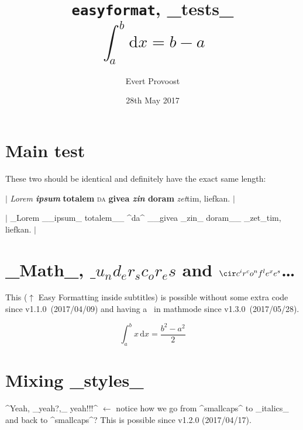 \documentclass[11pt]{article}
\title{\texttt{easyformat}, _tests_\\$$ \int_a^b \mathrm{d}x = b - a $$}
\author{Evert Provoost}
\date{28th May 2017}
\begin{document}
	\enableeasyformat %

	\maketitle
	\tableofcontents
	\vspace{2em}

	\section{Main test}
	These two should be identical and definitely have the exact same length:

	$|$ \textit{Lorem \textbf{ipsum}}\textbf{ totalem} \textsc{da} \textbf{givea \textit{zin} doram} \textit{zet}tim, liefkan. $|$

	$|$ _Lorem __ipsum_ totalem__ ^da^ __givea _zin_ doram__ _zet_tim, liefkan. $|$

	\section{_Math_, $\_ u_nd_er_sc_or_es$ and $\cir c^ir^co^nf^le^xe^s$\dots}
	This ($\uparrow$ Easy Formatting inside subtitles) is possible without some extra code since v1.1.0~(2017/04/09) and having a \cir\ in mathmode since v1.3.0~(2017/05/28).
	
	$$ \int_a^b x\,\mathrm{d}x = \frac{b^2 - a^2}{2} $$
	
	\section{Mixing _styles_}
	^Yeah, _yeah?,_ yeah!!!^
	$\leftarrow$ notice how we go from ^smallcaps^ to _italics_ and back to ^smallcaps^? This is possible since v1.2.0 (2017/04/17).
\end{document}
